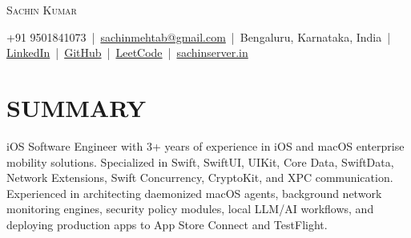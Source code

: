 \documentclass[letterpaper,11pt]{article}
\begin{document}
\begin{center}
{\Huge \scshape Sachin Kumar} \\ \vspace{6pt}

\small 
+91 9501841073 \,|\, 
\href{mailto:sachinmehtab@gmail.com}{sachinmehtab@gmail.com} \,|\, 
Bengaluru, Karnataka, India \,|\, 
\href{https://linkedin.com/in/sachinkumar6174}{LinkedIn} \,|\, 
\href{https://github.com/sachin6174}{GitHub} \,|\, 
\href{https://leetcode.com/u/sachinkumar6174/}{LeetCode} \,|\, 
\href{https://www.sachinserver.in}{sachinserver.in}
\end{center}

\vspace{-2pt}

\section{SUMMARY}
iOS Software Engineer with 3+ years of experience in iOS and macOS enterprise mobility solutions. Specialized in Swift, SwiftUI, UIKit, Core Data, SwiftData, Network Extensions, Swift Concurrency, CryptoKit, and XPC communication. Experienced in architecting daemonized macOS agents, background network monitoring engines, security policy modules, local LLM/AI workflows, and deploying production apps to App Store Connect and TestFlight.

\end{document}
